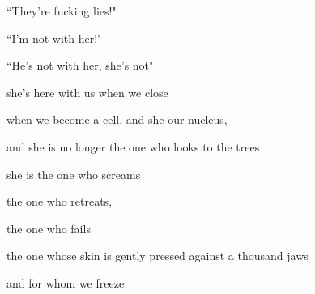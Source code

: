 \documentclass[11pt]{article}
\begin{document}
\begingroup
\begin{center}
``They're fucking lies!"
\end{center}
\endgroup

\begingroup
\begin{center}
``I'm not with her!"
\end{center}
\endgroup

\begingroup
\begin{center}
``He's not with her, she's not"
\end{center}
\endgroup

\vspace*{2\baselineskip}

\begingroup
\begin{center}
she's here with us when we close
\rightskip\leftskip
\end{center}
\endgroup

\begingroup
\begin{center}
when we become a cell, and she our nucleus,
\rightskip\leftskip
\end{center}
\endgroup

\begingroup
\begin{center}
and she is no longer the one who looks to the trees
\rightskip\leftskip
\end{center}
\endgroup

\begingroup
\begin{center}
she is the one who screams
\rightskip\leftskip
\end{center}
\endgroup

\begingroup
\begin{center}
the one who retreats,
\rightskip\leftskip
\end{center}
\endgroup

\begingroup
\begin{center}
the one who fails
\rightskip\leftskip
\end{center}
\endgroup

\begingroup
\begin{center}
the one whose skin is gently pressed against a thousand jaws
\rightskip\leftskip
\end{center}
\endgroup

\begingroup
\begin{center}
and for whom we freeze
\rightskip\leftskip
\end{center}
\endgroup
\end{document}
